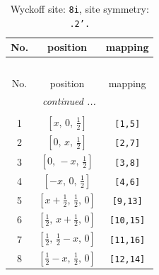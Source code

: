 \documentclass[fleqn,8pt]{jsarticle}
\begin{document}
\begin{longtable}{ccc}
\caption{Wyckoff site: {\tt 8i}, site symmetry: {\tt .2'.}}
 \\
 \hline \hline
No. & position & mapping \\ \hline \endfirsthead

\multicolumn{2}{l}{\tablename\ \thetable{}} \\
 \hline \hline
No. & position & mapping \\ \hline \endhead

 \hline \hline
\multicolumn{2}{r}{\footnotesize\it continued ...} \\ \endfoot

 \hline \hline
\multicolumn{2}{r}{} \\ \endlastfoot

1 & $\left[ x,\, 0,\, \frac{1}{2} \right]$ & {\tt [1,5]} \\ \hline
2 & $\left[ 0,\, x,\, \frac{1}{2} \right]$ & {\tt [2,7]} \\ \hline
3 & $\left[ 0,\, - x,\, \frac{1}{2} \right]$ & {\tt [3,8]} \\ \hline
4 & $\left[ - x,\, 0,\, \frac{1}{2} \right]$ & {\tt [4,6]} \\ \hline
5 & $\left[ x + \frac{1}{2},\, \frac{1}{2},\, 0 \right]$ & {\tt [9,13]} \\ \hline
6 & $\left[ \frac{1}{2},\, x + \frac{1}{2},\, 0 \right]$ & {\tt [10,15]} \\ \hline
7 & $\left[ \frac{1}{2},\, \frac{1}{2} - x,\, 0 \right]$ & {\tt [11,16]} \\ \hline
8 & $\left[ \frac{1}{2} - x,\, \frac{1}{2},\, 0 \right]$ & {\tt [12,14]} \\
\end{longtable}
\renewcommand{\arraystretch}{1.2}
\end{document}
